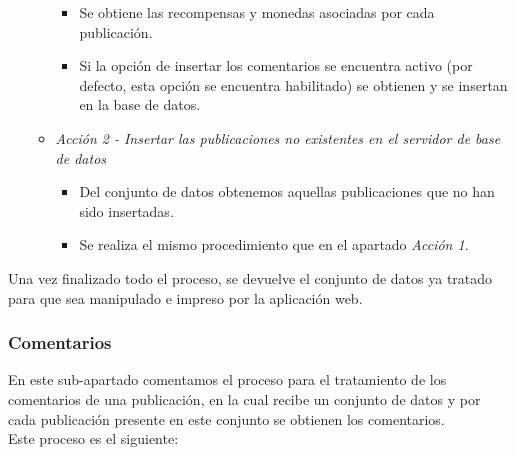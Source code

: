 \documentclass[../../main.tex]{subfiles}
\begin{document}
\begin{itemize}
\begin{itemize}
\begin{itemize}
            \item Se obtiene las recompensas y monedas asociadas por cada publicación.
            \item Si la opción de insertar los comentarios se encuentra activo (por defecto, esta opción se encuentra habilitado) se obtienen y se insertan en la base de datos.
        \end{itemize}
        \item \textit{Acción 2 - Insertar las publicaciones no existentes en el servidor de base de datos}
        \begin{itemize}
            \item Del conjunto de datos obtenemos aquellas publicaciones que no han sido insertadas.
            \item Se realiza el mismo procedimiento que en el apartado \textit{Acción 1}.
        \end{itemize}
    \end{itemize}
\end{itemize}

Una vez finalizado todo el proceso, se devuelve el conjunto de datos ya tratado para que sea manipulado e impreso por la aplicación web.

\subsubsection{Comentarios}

En este sub-apartado comentamos el proceso para el tratamiento de los comentarios de una publicación, en la cual recibe un conjunto de datos y por cada publicación presente en este conjunto se obtienen los comentarios.  \\

Este proceso es el siguiente:
\end{document}
